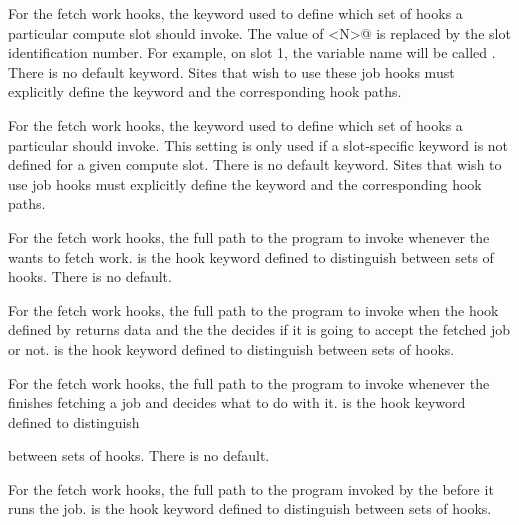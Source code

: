 \begin{description}

\label{param:SlotNJobHookKeyword}
\item[\Macro{SLOT<N>\_JOB\_HOOK\_KEYWORD}]
  For the fetch work hooks,
  the keyword used to define which set of hooks a particular
  compute slot should invoke.
  The value of \verb@<N>@ is replaced by the slot
  identification number. For example, on slot 1, the variable name will be
  called \MacroNI{[SLOT1\_JOB\_HOOK\_KEYWORD}.
  There is no default keyword.
  Sites that wish to use these job hooks must explicitly define the
  keyword and the corresponding hook paths.

\label{param:StartdJobHookKeyword}
\item[\Macro{STARTD\_JOB\_HOOK\_KEYWORD}]
  For the fetch work hooks,
  the keyword used to define which set of hooks a particular
   should invoke.
  This setting is only used if a slot-specific keyword is not defined
  for a given compute slot.
  There is no default keyword.
  Sites that wish to use job hooks must explicitly define the
  keyword and the corresponding hook paths.

\label{param:HookFetchWork}
\item[\Macro{<Keyword>\_HOOK\_FETCH\_WORK}]
  For the fetch work hooks,
  the full path to the program to invoke whenever the 
  wants to fetch work.
   is the hook keyword defined to distinguish
  between sets of hooks.
  There is no default.

\label{param:HookReplyFetch}
\item[\Macro{<Keyword>\_HOOK\_REPLY\_FETCH}]
  For the fetch work hooks,
  the full path to the program to invoke when the hook defined by
    returns data and the the 
  decides if it is going to accept the fetched job or not.
   is the hook keyword defined to distinguish
  between sets of hooks.

\label{param:HookReplyClaim}
\item[\Macro{<Keyword>\_HOOK\_REPLY\_CLAIM}]
  For the fetch work hooks,
  the full path to the program to invoke whenever the 
  finishes fetching a job and decides what to do with it.
   is the hook keyword defined to distinguish

  between sets of hooks.
  There is no default.

\label{param:HookPrepareJob}
\item[\Macro{<Keyword>\_HOOK\_PREPARE\_JOB}]
  For the fetch work hooks,
  the full path to the program invoked by the  before it
  runs the job.
   is the hook keyword defined to distinguish
  between sets of hooks.


\end{description}
